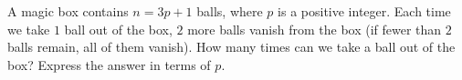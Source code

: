 A magic box contains $n=3p+1$ balls, where $p$ is a positive integer. Each time we take $1$ ball out of the box, $2$ more balls vanish from the box (if fewer than $2$ balls remain, all of them vanish). How many times can we take a ball out of the box? Express the answer in terms of $p$.

